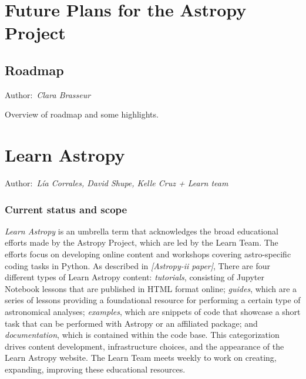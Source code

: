 \documentclass[modern]{aastex631}
\newcommand{\secauthor}[1]{{\color{blue}Author:~\textit{#1}}}
\begin{document}
\section{Future Plans for the Astropy Project} \label{sec:future}

\subsection{Roadmap}

\secauthor{Clara Brasseur}

Overview of roadmap and some highlights.

\section{Learn Astropy} \label{sec:learn}

\secauthor{Lía Corrales, David Shupe, Kelle Cruz + Learn team}

\subsubsection{Current status and scope}

{\it Learn Astropy} is an umbrella term that acknowledges the broad educational efforts made by the Astropy Project, which are led by the Learn Team.
The efforts focus on developing online content and workshops covering astro-specific coding tasks in Python.
As described in \textsl{[Astropy-ii paper]}, There are four different types of Learn Astropy content: \textit{tutorials}, consisting of Jupyter Notebook lessons that are published in HTML format online; \textit{guides}, which are a series of lessons providing a foundational resource for performing a certain type of astronomical analyses; \textit{examples}, which are snippets of code that showcase a short task that can be performed with Astropy or an affiliated package; and \textit{documentation}, which is contained within the code base.
This categorization drives content development, infrastructure choices, and the appearance of the Learn Astropy website.
The Learn Team meets weekly to work on creating, expanding, improving these educational resources.
\end{document}
